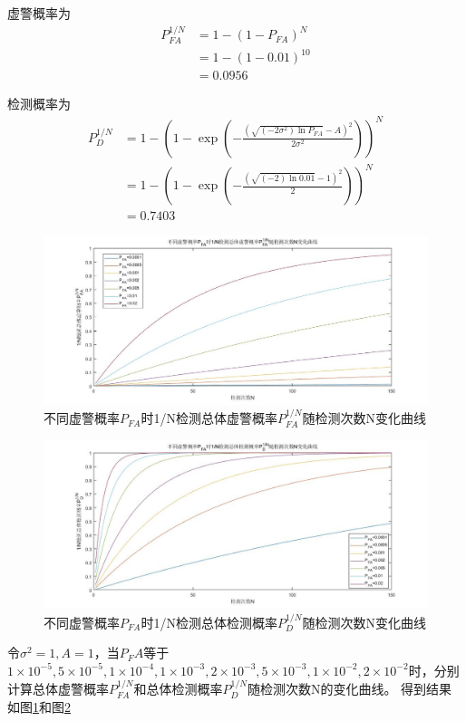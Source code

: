 \documentclass[fontset=windows]{article}
\numberwithin{figure}{section}
\begin{document}
虚警概率为
\begin{align*}
	P^{1/N}_{FA} & =1-(1-P_{FA})^N  \\
	             & =1-(1-0.01)^{10} \\
	             & =0.0956
\end{align*}

检测概率为
\begin{align*}
	P^{1/N}_D & =1-\left(1-\exp\left(-\frac{(\sqrt{(-2\sigma^2)\ln P_{FA}}-A)^2}{2\sigma^2}\right)\right)^N \\
	          & =1-\left(1-\exp\left(-\frac{(\sqrt{(-2)\ln 0.01}-1)^2}{2}\right)\right)^N                   \\
	          & =0.7403
\end{align*}

\begin{figure}[H]
	\centering
	\includegraphics[scale=0.35]{fig2_1.jpg}
	\caption{不同虚警概率\(P_{FA}\)时1/N检测总体虚警概率\(P^{1/N}_{FA}\)随检测次数N变化曲线}
	\label{5.2.1}
\end{figure}

\begin{figure}[H]
	\centering
	\includegraphics[scale=0.35]{fig2_2.jpg}
	\caption{不同虚警概率\(P_{FA}\)时1/N检测总体检测概率\(P^{1/N}_D\)随检测次数N变化曲线}
	\label{5.2.2}
\end{figure}

令\(\sigma^2=1,A=1\)，当\(P_FA\)等于\(1\times10^{-5},5\times10^{-5},1\times10^{-4},1\times10^{-3},2\times10^{-3},5\times10^{-3},1\times10^{-2},2\times10^{-2}\)时，分别计算总体虚警概率\(P^{1/N}_{FA}\)和总体检测概率\(P^{1/N}_D\)随检测次数N的变化曲线。
得到结果如图\ref*{5.2.1}和图\ref*{5.2.2}
\end{document}
